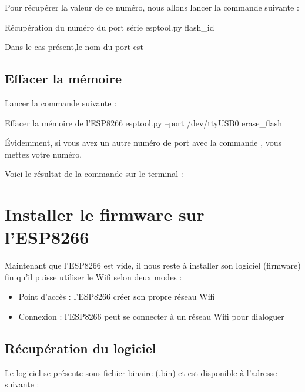 Pour récupérer la valeur de ce numéro, nous allons lancer la commande suivante : 

\begin{Bash}{Récupération du numéro du port série}
esptool.py flash_id
\end{Bash}


Dans le cas présent,le nom du port est 

\section{Effacer la mémoire}

Lancer la commande suivante : 
\begin{Bash}{Effacer la mémoire de l'ESP8266}
esptool.py --port /dev/ttyUSB0 erase_flash
\end{Bash}

Évidemment, si vous avez un autre numéro de port avec la commande , vous mettez votre numéro.

Voici le résultat de la commande sur le terminal : 



\chapter{Installer le firmware sur \\l'ESP8266}

Maintenant que l'ESP8266 est vide, il nous reste à installer son logiciel (firmware) fin qu'il puisse utiliser le Wifi selon deux modes : 

\begin{itemize}
    \item Point d'accès : l'ESP8266 créer son propre réseau Wifi
    \item Connexion : l'ESP8266 peut se connecter à un réseau Wifi pour dialoguer
\end{itemize}

\section{Récupération du logiciel}

Le logiciel se présente sous fichier binaire (.bin) et est disponible à l'adresse suivante : \\

